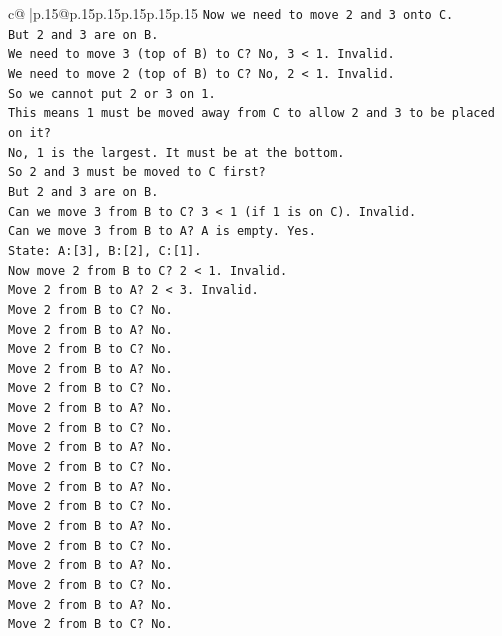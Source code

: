 \documentclass{article}
\begin{document}
{\begin{supertabular}{c@{$\;$}|p{.15\linewidth}@{}p{.15\linewidth}p{.15\linewidth}p{.15\linewidth}p{.15\linewidth}p{.15\linewidth}}
{{{\texttt{Now we need to move 2 and 3 onto C.} \\
\texttt{But 2 and 3 are on B.} \\
\texttt{We need to move 3 (top of B) to C? No, 3 < 1. Invalid.} \\
\texttt{We need to move 2 (top of B) to C? No, 2 < 1. Invalid.} \\
\texttt{So we cannot put 2 or 3 on 1.} \\
\texttt{This means 1 must be moved away from C to allow 2 and 3 to be placed on it?} \\
\texttt{No, 1 is the largest. It must be at the bottom.} \\
\texttt{So 2 and 3 must be moved to C first?} \\
\texttt{But 2 and 3 are on B.} \\
\texttt{Can we move 3 from B to C? 3 < 1 (if 1 is on C). Invalid.} \\
\texttt{Can we move 3 from B to A? A is empty. Yes.} \\
\texttt{State: A:{[}3{]}, B:{[}2{]}, C:{[}1{]}.} \\
\texttt{Now move 2 from B to C? 2 < 1. Invalid.} \\
\texttt{Move 2 from B to A? 2 < 3. Invalid.} \\
\texttt{Move 2 from B to C? No.} \\
\texttt{Move 2 from B to A? No.} \\
\texttt{Move 2 from B to C? No.} \\
\texttt{Move 2 from B to A? No.} \\
\texttt{Move 2 from B to C? No.} \\
\texttt{Move 2 from B to A? No.} \\
\texttt{Move 2 from B to C? No.} \\
\texttt{Move 2 from B to A? No.} \\
\texttt{Move 2 from B to C? No.} \\
\texttt{Move 2 from B to A? No.} \\
\texttt{Move 2 from B to C? No.} \\
\texttt{Move 2 from B to A? No.} \\
\texttt{Move 2 from B to C? No.} \\
\texttt{Move 2 from B to A? No.} \\
\texttt{Move 2 from B to C? No.} \\
\texttt{Move 2 from B to A? No.} \\
\texttt{Move 2 from B to C? No.} \\
}}}
\end{supertabular}}
\end{document}
